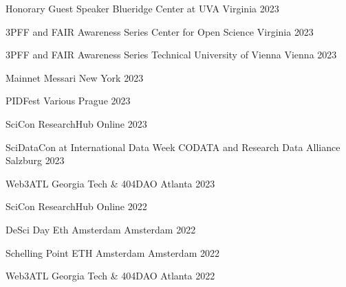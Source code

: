 \begin{cvhonors}
  \cvhonor
    {Honorary Guest Speaker} %
    {Blueridge Center at UVA} %
    {Virginia} %
    {2023} %

  \cvhonor
    {3PFF and FAIR Awareness Series} %
    {Center for Open Science} %
    {Virginia} %
    {2023} %

  \cvhonor
    {3PFF and FAIR Awareness Series} %
    {Technical University of Vienna} %
    {Vienna} %
    {2023} %

  \cvhonor
    {Mainnet} %
    {Messari} %
    {New York} %
    {2023} %

  \cvhonor
    {PIDFest} %
    {Various} %
    {Prague} %
    {2023} %

  \cvhonor
    {SciCon} %
    {ResearchHub} %
    {Online} %
    {2023} %

  \cvhonor
    {SciDataCon at International Data Week} %
    {CODATA and Research Data Alliance} %
    {Salzburg} %
    {2023} %

  \cvhonor
    {Web3ATL} %
    {Georgia Tech \& 404DAO} %
    {Atlanta} %
    {2023} %

  \cvhonor
    {SciCon} %
    {ResearchHub} %
    {Online} %
    {2022} %

  \cvhonor
    {DeSci Day} %
    {Eth Amsterdam} %
    {Amsterdam} %
    {2022} %

  \cvhonor
    {Schelling Point} %
    {ETH Amsterdam} %
    {Amsterdam} %
    {2022} %

  \cvhonor
    {Web3ATL} %
    {Georgia Tech \& 404DAO} %
    {Atlanta} %
    {2022} %

\end{cvhonors}

